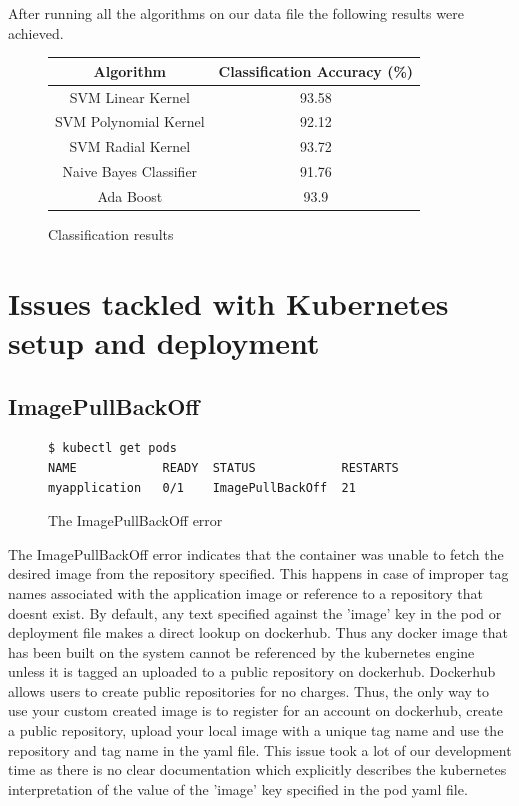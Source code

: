 \documentclass[9pt,twocolumn,twoside]{../../styles/osajnl}
\begin{document}
After running all the algorithms on our data file the following
results were achieved.

\begin{figure}[ht]
\begin{center}
 \begin{tabular}{|c | c|} 
 \hline
Algorithm  & Classification Accuracy (\%) \\ [0.5ex] 
 \hline\hline
    
SVM Linear Kernel & 93.58 \\
\hline

SVM Polynomial Kernel & 92.12 \\
\hline

SVM Radial Kernel & 93.72 \\[1ex]
\hline

Naive Bayes Classifier & 91.76 \\[1ex]

\hline
Ada Boost  & 93.9 \\[1ex]
\hline

\end{tabular}
\end{center}
  \caption{Classification results}
\end{figure}


\section{Issues tackled with Kubernetes setup and deployment}

\subsection{ImagePullBackOff}

\begin{figure}[H]
\begin{verbatim}
$ kubectl get pods
NAME            READY  STATUS            RESTARTS  
myapplication   0/1    ImagePullBackOff  21         
\end{verbatim}
\caption{The ImagePullBackOff error}
\vspace{-3mm}
\label{The ImagePullBackOff error}
\end{figure}

The ImagePullBackOff error indicates that the container was unable to
fetch the desired image from the repository specified. This happens in
case of improper tag names associated with the application image or
reference to a repository that doesnt exist.  By default, any text
specified against the 'image' key in the pod or deployment file makes
a direct lookup on dockerhub. Thus any docker image that has been
built on the system cannot be referenced by the kubernetes engine
unless it is tagged an uploaded to a public repository on
dockerhub. Dockerhub allows users to create public repositories for no
charges. Thus, the only way to use your custom created image is to
register for an account on dockerhub, create a public repository,
upload your local image with a unique tag name and use the repository
and tag name in the yaml file. This issue took a lot of our
development time as there is no clear documentation which explicitly
describes the kubernetes interpretation of the value of the 'image'
key specified in the pod yaml file.
\end{document}

